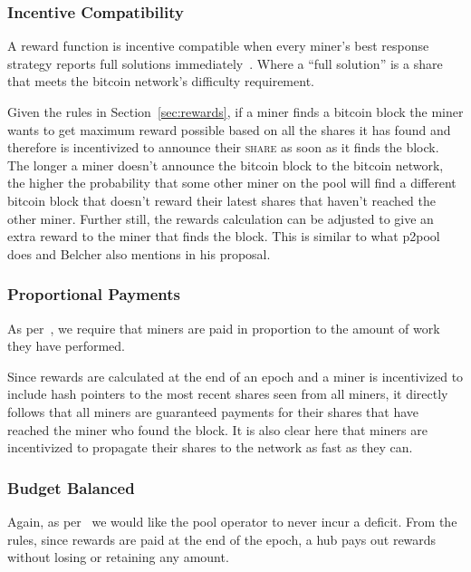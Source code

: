 \documentclass{article}
\begin{document}
\subsubsection{Incentive Compatibility}\label{sec:incentive-compatability}

A reward function is incentive compatible when every miner's best
response strategy reports full solutions
immediately~\cite{incentives-compatible}. Where a ``full solution'' is
a share that meets the bitcoin network's difficulty requirement.

Given the rules in Section~\ref{sec:rewards}, if a miner finds a
bitcoin block the miner wants to get maximum reward possible based on
all the shares it has found and therefore is incentivized to announce
their \textsc{share} as soon as it finds the block. The longer a miner
doesn't announce the bitcoin block to the bitcoin network, the higher
the probability that some other miner on the pool will find a
different bitcoin block that doesn't reward their latest shares that
haven't reached the other miner. Further still, the rewards
calculation can be adjusted to give an extra reward to the miner that
finds the block. This is similar to what p2pool does and Belcher also
mentions in his proposal.

\subsubsection{Proportional Payments}\label{sec:proportional-payments}

As per~\cite{incentives-compatible}, we require that miners are paid
in proportion to the amount of work they have performed.

Since rewards are calculated at the end of an epoch and a miner is
incentivized to include hash pointers to the most recent shares seen
from all miners, it directly follows that all miners are guaranteed
payments for their shares that have reached the miner who found the
block. It is also clear here that miners are incentivized to propagate
their shares to the network as fast as they can.

\subsubsection{Budget Balanced}\label{sec:budget-balanced}

Again, as per~\cite{incentives-compatible} we would like the pool
operator to never incur a deficit. From the rules, since rewards are
paid at the end of the epoch, a hub pays out rewards without losing or
retaining any amount.
\end{document}
